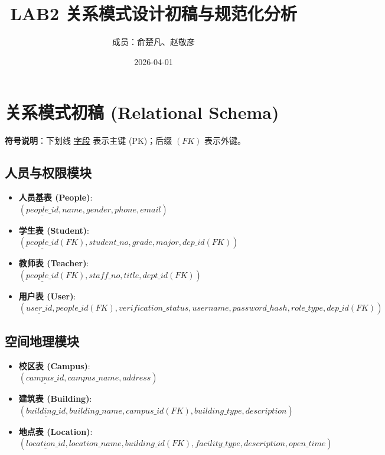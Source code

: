 \documentclass[11pt, a4paper]{article}
\title{LAB2 关系模式设计初稿与规范化分析}
\author{成员：俞楚凡、赵敬彦}
\date{2026-04-01}
\begin{document}
\maketitle

\section{关系模式初稿 (Relational Schema)}\label{sec:schema}

\textbf{符号说明}：下划线 \underline{字段} 表示主键 (PK)；后缀 $(FK)$ 表示外键。

\subsection{人员与权限模块}
\begin{itemize}
    \item \textbf{人员基表 (People)}: 
    \\ $(\underline{people\_id}, name, gender, phone, email)$
    \item \textbf{学生表 (Student)}: 
    \\ $(\underline{people\_id}(FK), student\_no, grade, major, dep\_id(FK))$
    \item \textbf{教师表 (Teacher)}: 
    \\ $(\underline{people\_id}(FK), staff\_no, title, dept\_id(FK))$
    \item \textbf{用户表 (User)}: 
    \\ $(\underline{user\_id}, people\_id(FK), verification\_status, username, password\_hash, role\_type, dep\_id(FK))$
\end{itemize}

\subsection{空间地理模块}
\begin{itemize}
    \item \textbf{校区表 (Campus)}: 
    \\ $(\underline{campus\_id}, campus\_name, address)$
    \item \textbf{建筑表 (Building)}: 
    \\ $(\underline{building\_id}, building\_name, campus\_id(FK), building\_type, description)$
    \item \textbf{地点表 (Location)}: 
    \\ $(\underline{location\_id}, location\_name, building\_id(FK), facility\_type, description, open\_time)$
\end{itemize}
\end{document}
